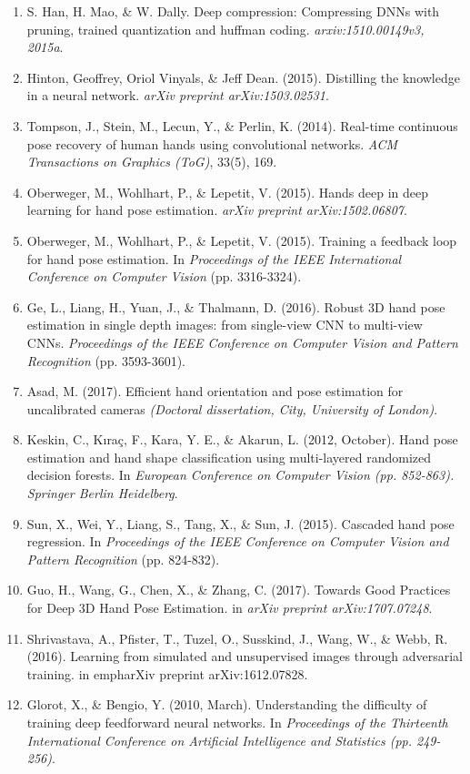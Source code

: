 \documentclass{article}
\begin{document}
\begin{enumerate}
\item S. Han, H. Mao, \& W. Dally. Deep compression: Compressing DNNs with pruning, trained
quantization and huffman coding. \emph{arxiv:1510.00149v3, 2015a}.
\item Hinton, Geoffrey, Oriol Vinyals, \& Jeff Dean.  (2015). Distilling the knowledge in a neural network. \emph{arXiv preprint arXiv:1503.02531}.
\item Tompson, J., Stein, M., Lecun, Y., \& Perlin, K. (2014). Real-time continuous pose recovery of human hands using convolutional networks. \emph{ACM Transactions on Graphics (ToG)}, 33(5), 169.
\item Oberweger, M., Wohlhart, P., \& Lepetit, V. (2015). Hands deep in deep learning for hand pose estimation. \emph{arXiv preprint arXiv:1502.06807}.
\item Oberweger, M., Wohlhart, P., \& Lepetit, V. (2015). Training a feedback loop for hand pose estimation. In \emph{Proceedings of the IEEE International Conference on Computer Vision} (pp. 3316-3324).
\item Ge, L., Liang, H., Yuan, J., \& Thalmann, D. (2016). Robust 3D hand pose estimation in single depth images: from single-view CNN to multi-view CNNs. \emph{Proceedings of the IEEE Conference on Computer Vision and Pattern Recognition} (pp. 3593-3601).
\item Asad, M. (2017). Efficient hand orientation and pose estimation for uncalibrated cameras \emph{(Doctoral dissertation, City, University of London)}.
\item Keskin, C., Kıraç, F., Kara, Y. E., \& Akarun, L. (2012, October). Hand pose estimation and hand shape classification using multi-layered randomized decision forests. In \emph{European Conference on Computer Vision (pp. 852-863). Springer Berlin Heidelberg}.
\item Sun, X., Wei, Y., Liang, S., Tang, X., \& Sun, J. (2015). Cascaded hand pose regression. In \emph{Proceedings of the IEEE Conference on Computer Vision and Pattern Recognition} (pp. 824-832).
\item Guo, H., Wang, G., Chen, X., \& Zhang, C. (2017). Towards Good Practices for Deep 3D Hand Pose Estimation. in \emph{arXiv preprint arXiv:1707.07248}.
\item Shrivastava, A., Pfister, T., Tuzel, O., Susskind, J., Wang, W., \& Webb, R. (2016). Learning from simulated and unsupervised images through adversarial training. in emph{arXiv preprint arXiv:1612.07828}.
\item Glorot, X., \& Bengio, Y. (2010, March). Understanding the difficulty of training deep feedforward neural networks. In \emph{ Proceedings of the Thirteenth International Conference on Artificial Intelligence and Statistics (pp. 249-256)}.

\end{enumerate}
\end{document}
